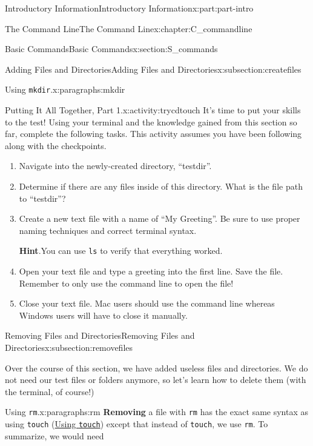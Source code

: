 \documentclass[oneside,10pt,]{book}
\newcommand{\blocktitlefont}{\relax}
\newcommand{\mono}[1]{\texttt{#1}}
\newcommand{\terminology}[1]{\textbf{#1}}
\begin{document}
\begin{partptx}{Introductory Information}{}{Introductory Information}{}{}{x:part:part-intro}
\begin{chapterptx}{The Command Line}{}{The Command Line}{}{}{x:chapter:C_commandline}
\begin{sectionptx}{Basic Commands}{}{Basic Commands}{}{}{x:section:S_commands}
\begin{subsectionptx}{Adding Files and Directories}{}{Adding Files and Directories}{}{}{x:subsection:createfiles}
\begin{paragraphs}{Using \mono{mkdir}.}{x:paragraphs:mkdir}
\end{paragraphs}%
\begin{activity}{Putting It All Together, Part 1.}{x:activity:trycdtouch}%
%
It's time to put your skills to the test! Using your terminal and the knowledge gained from this section so far, complete the following tasks. This activity assumes you have been following along with the checkpoints.%
\begin{enumerate}[font=\bfseries,label=(\alph*),ref=\alph*]
\item{}Navigate into the newly-created directory, ``testdir''.%
\item{}Determine if there are any files inside of this directory. What is the file path to ``testdir''?%
\item{}Create a new text file with a name of ``My Greeting''. Be sure to use proper naming techniques and correct terminal syntax.%
\par\smallskip%
\noindent\textbf{\blocktitlefont Hint}.\hypertarget{g:hint:idm480511480}{}\quad{}You can use \mono{ls} to verify that everything worked.%
\item{}Open your text file and type a greeting into the first line. Save the file. Remember to only use the command line to open the file!%
\item{}Close your text file. Mac users should use the command line whereas Windows users will have to close it manually.%
\end{enumerate}
\end{activity}%
\end{subsectionptx}
%
%
\typeout{************************************************}
\typeout{************************************************}
%
\begin{subsectionptx}{Removing Files and Directories}{}{Removing Files and Directories}{}{}{x:subsection:removefiles}
%
\begin{introduction}{}%
Over the course of this section, we have added useless files and directories. We do not need our test files or folders anymore, so let's learn how to delete them (with the terminal, of course!)%
\end{introduction}%
\begin{paragraphs}{Using \mono{rm}.}{x:paragraphs:rm}%
\index{\mono{rm}}%
%
\index{command line!\mono{rm}}%
\terminology{Removing} a file with \mono{rm} has the exact same syntax as using \mono{touch} (\hyperlink{x:paragraphs:touch}{Using \mono{touch}}) except that instead of \mono{touch}, we use \mono{rm}. To summarize, we would need%

\end{paragraphs}
\end{subsectionptx}
\end{sectionptx}
\end{chapterptx}
\end{partptx}
\end{document}
